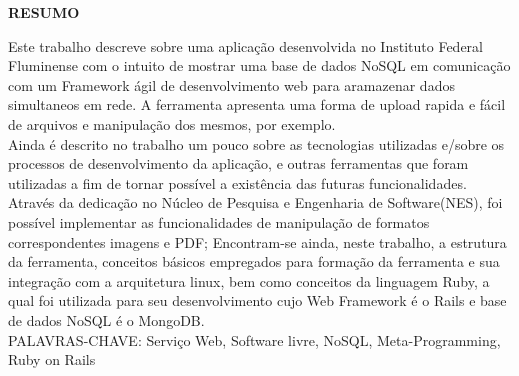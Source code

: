 \begin{center}
\textbf{RESUMO}
\end{center}
\singlespacing

\noindent Este trabalho descreve sobre uma aplicação desenvolvida no Instituto Federal Fluminense com o intuito de mostrar uma base de dados NoSQL em comunicação com um Framework ágil de desenvolvimento web para aramazenar dados simultaneos
em rede. A ferramenta apresenta uma forma de upload rapida e fácil de arquivos e manipulação dos mesmos, por exemplo.\\

\noindent Ainda é descrito no trabalho um pouco sobre as tecnologias utilizadas e/sobre os processos de desenvolvimento da aplicação, e outras ferramentas que foram utilizadas a fim de tornar possível a existência das futuras funcionalidades. Através da 
dedicação no Núcleo de Pesquisa e Engenharia de Software(NES), foi possível implementar as funcionalidades de manipulação de formatos correspondentes imagens e PDF; Encontram-se ainda, neste trabalho, a estrutura da ferramenta, conceitos básicos empregados para formação da ferramenta e sua integração com a arquitetura linux, bem como conceitos da linguagem Ruby, a qual foi utilizada para seu desenvolvimento
cujo Web Framework é o Rails e base de dados NoSQL é o MongoDB. \\

\noindent PALAVRAS-CHAVE:  Serviço Web, Software livre, NoSQL, Meta-Programming, Ruby on Rails
